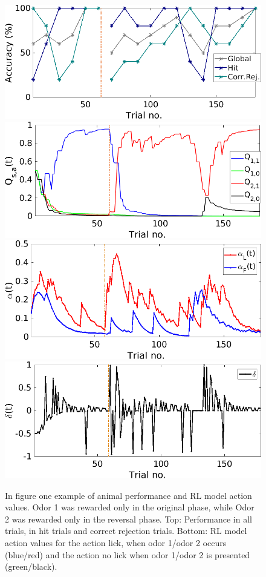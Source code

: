 \begin{figure}
\centering
    \includegraphics[scale=0.42]{figures/PerfEndrevAn1.png}
    \includegraphics[scale=0.42]{figures/QValuesEndrevAn1.png}
    \includegraphics[scale=0.42]{figures/AlphaEndrevAn1.png}
    \includegraphics[scale=0.42]{figures/DeltaEndrevAn1.png}
    \caption{In figure one example of animal performance and RL model action values.
    Odor 1 was rewarded only in the original phase, while Odor 2 was rewarded only in the reversal phase. Top: Performance in all trials, in hit trials and correct rejection trials. Bottom: RL model action values for the action lick, when odor 1/odor 2 occurs (blue/red) and the action no lick when odor 1/odor 2 is presented (green/black).}
    \label{fig:PerfRL}
\end{figure}
